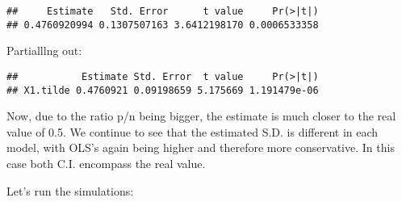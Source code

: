 \documentclass[
]{article}
\begin{document}
\begin{verbatim}
##     Estimate   Std. Error      t value     Pr(>|t|) 
## 0.4760920994 0.1307507163 3.6412198170 0.0006533358
\end{verbatim}

Partialllng out:

\begin{verbatim}
##           Estimate Std. Error  t value     Pr(>|t|)
## X1.tilde 0.4760921 0.09198659 5.175669 1.191479e-06
\end{verbatim}

Now, due to the ratio p/n being bigger, the estimate is much closer to
the real value of 0.5. We continue to see that the estimated S.D. is
different in each model, with OLS's again being higher and therefore
more conservative. In this case both C.I. encompass the real value.

Let's run the simulations:
\end{document}

